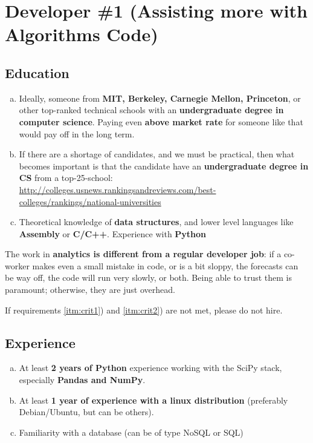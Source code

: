 \documentclass[12pt]{article}
\author{David Karapetyan}
\begin{document}
\section{Developer \#1 (Assisting more with Algorithms Code)}
\subsection{Education}
\begin{enumerate}[a)]
	\item
		Ideally, someone from \textbf{MIT, Berkeley, Carnegie Mellon, Princeton}, or other
		top-ranked technical schools with an \textbf{undergraduate degree in
		computer science}. 
		Paying even \textbf{above market rate} for someone like that would pay off in the
		long term. 
	\item\label{itm:crit1} If there are a shortage of candidates, and we must be practical, then
		what becomes important is that the candidate have an \textbf{undergraduate
		degree in CS} from a top-25-school: \\
		\href{}{http://colleges.usnews.rankingsandreviews.com/best-colleges/rankings/national-universities}
	\item\label{itm:crit2} Theoretical knowledge of \textbf{data structures}, and lower level languages like
		\textbf{Assembly} or \textbf{C/C++}. Experience with \textbf{Python}

\end{enumerate}

The work in \textbf{analytics is different from a regular developer
job}: if a co-worker makes even a small mistake in code, or is a bit sloppy,
the forecasts can be way off, the code will run very slowly, or both. Being able to trust them is paramount; otherwise, they are just overhead.


\begin{framed}
	If requirements \ref{itm:crit1}) and \ref{itm:crit2}) are not met, please do not hire.
\end{framed}

\subsection{Experience}
\begin{enumerate}[a)]
	\item\label{itm:exp1}At least \textbf{2 years of Python} experience working with the SciPy stack,
		especially \textbf{Pandas and NumPy}.
	\item\label{itm:exp2}
		At least \textbf{1 year of experience with a linux distribution} (preferably
		Debian/Ubuntu, but can be others). 
	\item\label{itm:exp3} Familiarity with a database (can be of type NoSQL or SQL)
\end{enumerate}
\end{document}
